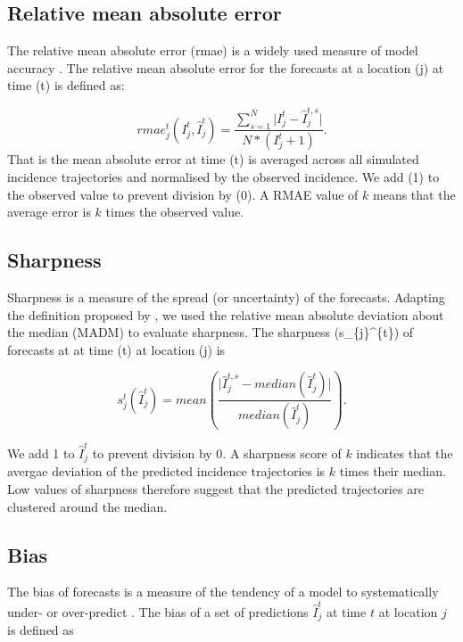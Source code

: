 \documentclass[9pt,twocolumn,twoside,lineno]{pnas-new}
\begin{document}
{\subsection*{Relative mean absolute error}\label{relative-mean-absolute-error}

The relative mean absolute error (rmae) is a widely used measure of
model accuracy \cite{tofallis2015better}. The relative mean absolute
error for the forecasts at a location (j) at time (t) is defined as:

\begin{equation*}
  rmae_{j}^{t}(I_{j}^{t}, \hat{I}_{j}^{t}) = 
 \frac{
 \sum_{s = 1}^N{\lvert I_{j}^{t} - \hat{I}_{j}^{t, s} \rvert}
 }
 { N *  (I_{j}^{t} + 1)}.
\end{equation*} That is the mean absolute error at time (t) is averaged
across all simulated incidence trajectories and normalised by the
observed incidence. We add (1) to the observed value to prevent division
by (0). A RMAE value of \(k\) means that the average error is \(k\)
times the observed value.

\subsection*{Sharpness}\label{sharpness}

Sharpness is a measure of the spread (or uncertainty) of the forecasts.
Adapting the definition proposed by \cite{funk2017assessing}, we used
the relative mean absolute deviation about the median (MADM) to evaluate
sharpness. The sharpness (s\_\{j\}\^{}\{t\}) of forecasts at at time (t)
at location (j) is

\begin{equation*}
s_{j}^{t}(\hat{I}_{j}^{t}) = 
mean 
\left(
\frac{\lvert \hat{I}_{j}^{t, s} - median(\hat{I}_{j}^{t}) \rvert} 
{median(\hat{I}_{j}^{t})} 
\right).
\end{equation*}

We add 1 to \(\hat{I}_{j}^{t}\) to prevent division by 0. A sharpness
score of \(k\) indicates that the avergae deviation of the predicted
incidence trajectories is \(k\) times their median. Low values of
sharpness therefore suggest that the predicted trajectories are
clustered around the median.


\subsection*{Bias}\label{bias}

The bias of forecasts is a measure of the tendency of a model to
systematically under- or over-predict \cite{funk2017assessing}. The bias
of a set of predictions $\hat{I}_{j}^{t}$ at time \(t\) at
location \(j\) is defined as

}
\end{document}
